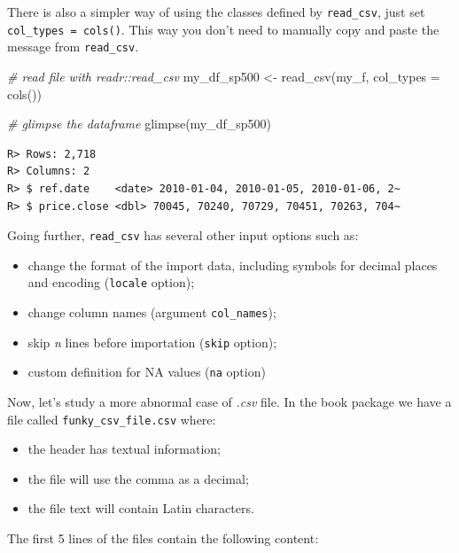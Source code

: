 \documentclass[
  12pt,
]{book}
\newenvironment{Shaded}{\begin{snugshade}}{\end{snugshade}}
\newcommand{\AttributeTok}[1]{\textcolor[rgb]{0.61,0.61,0.61}{#1}}
\newcommand{\CommentTok}[1]{\textcolor[rgb]{0.37,0.37,0.37}{\textit{#1}}}
\newcommand{\FunctionTok}[1]{\textcolor[rgb]{0,0,0}{#1}}
\newcommand{\NormalTok}[1]{#1}
\newcommand{\OtherTok}[1]{\textcolor[rgb]{0.37,0.37,0.37}{#1}}
\providecommand{\tightlist}{%
  \setlength{\itemsep}{0pt}\setlength{\parskip}{0pt}}
\begin{document}
There is also a simpler way of using the classes defined by \texttt{read\_csv}, just set \texttt{col\_types\ =\ cols()}. This way you don't need to manually copy and paste the message from \texttt{read\_csv}.

\begin{Shaded}
\begin{Highlighting}[]
\CommentTok{\# read file with readr::read\_csv}
\NormalTok{my\_df\_sp500 }\OtherTok{\textless{}{-}} \FunctionTok{read\_csv}\NormalTok{(my\_f, }
                        \AttributeTok{col\_types =} \FunctionTok{cols}\NormalTok{())}

\CommentTok{\# glimpse the dataframe}
\FunctionTok{glimpse}\NormalTok{(my\_df\_sp500)}
\end{Highlighting}
\end{Shaded}

\begin{verbatim}
R> Rows: 2,718
R> Columns: 2
R> $ ref.date    <date> 2010-01-04, 2010-01-05, 2010-01-06, 2~
R> $ price.close <dbl> 70045, 70240, 70729, 70451, 70263, 704~
\end{verbatim}

Going further, \texttt{read\_csv} has several other input options such as:

\begin{itemize}
\tightlist
\item
  change the format of the import data, including symbols for decimal places and encoding (\texttt{locale} option);
\item
  change column names (argument \texttt{col\_names});
\item
  skip \emph{n} lines before importation (\texttt{skip} option);
\item
  custom definition for NA values (\texttt{na} option)
\end{itemize}

Now, let's study a more abnormal case of \emph{.csv} file. In the book package we have a file called \texttt{funky\_csv\_file.csv} where:

\begin{itemize}
\tightlist
\item
  the header has textual information;
\item
  the file will use the comma as a decimal;
\item
  the file text will contain Latin characters.
\end{itemize}

The first 5 lines of the files contain the following content:
\end{document}
